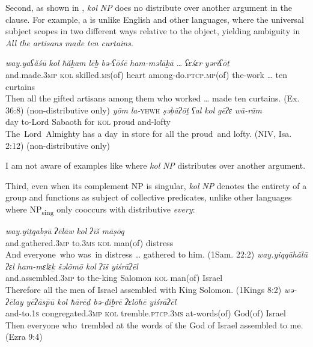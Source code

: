 \documentclass[output=paper]{langsci/langscibook}
\begin{document}
Second, as shown in , \textit{kol} \textit{NP} does no distribute over another argument in the clause. For example, a is unlike English and other languages, where the universal subject scopes in two different ways relative to the object, yielding ambiguity in \textit{All} \textit{the} \textit{artisans} \textit{made} \textit{ten} \textit{curtains}.

\ea%
    \label{ex:doron:15}
    \ea
    \gll \textit{way.yaʕăśū}      \textit{kol}   \textit{ħăḵam}            \textit{lēḇ}     \textit{bə-ʕōśē}                          \textit{ham-məlāḵā}  …  \textit{ʕɛśɛr}  \textit{yərīʕōṯ}\\
         and.made.\textsc{3mp} \textsc{kol} skilled.\textsc{ms}(of) heart among-do.\textsc{ptcp.mp}(of)  the-work      \textsc{…}   ten    curtains  \\
    \glt Then all the gifted artisans among them who worked … made ten curtains.   (Ex. 36:8)  (non-distributive only)
    \ex
    \gll \textit{yōm} \textit{la-}\textsc{yhwh}\textit{\MakeUppercase{} } \textit{ṣəḇāʔōṯ}    \textit{ʕal}  \textit{kol}    \textit{gēʔɛ}    \textit{wā-rām}       \\
         day  to-Lord   Sabaoth   for  \textsc{kol}  proud and-lofty  \\
    \glt The~Lord~Almighty has a day~in store for all the proud~and lofty. (NIV, Isa. 2:12) (non-distributive only)
    \z
\z

I am not aware of examples like  where \textit{kol} \textit{NP} distributes over another argument.

Third, even when its complement NP is singular, \textit{kol} \textit{NP} denotes the entirety of a group and functions as subject of collective predicates, unlike other languages where NP\textsubscript{sing} only cooccurs with distributive \textit{every}:

\ea%
    \label{ex:doron:16}
    \ea
    \gll \textit{way.yiṯqabṣū}         \textit{ʔēlāw}    \textit{kol}   \textit{ʔīš}           \textit{māṣōq}\\
         and.gathered.3\textsc{mp}  to.\textsc{3ms}  \textsc{kol} man(of) distress \\
    \glt And everyone~who was~in distress … gathered to him. (1Sam. 22:2)
    \ex
    \gll \textit{way.yiqqāhălū}          \textit{ʔɛl} \textit{ham-mɛlɛḵ}  \textit{šəlōmō}    \textit{kol}   \textit{ʔīš}          \textit{yiśrāʔēl}\\
         and.assembled.3\textsc{mp}  to  the-king      Salomon \textsc{kol} man(of) Israel\\
    \glt Therefore all the men of Israel assembled with King Solomon. (1Kings 8:2)
    \ex
    \gll \textit{wə-ʔēlay}   \textit{yēʔās\={p}ū                 kol   ħārēḏ                       bə-ḏiḇrē       ʔɛlōhē      yiśrāʔēl}\\
         and-to.\textsc{1s}  congregated.3\textsc{mp}  \textsc{kol} tremble.\textsc{ptcp.3ms}  at-words(of)  God(of)  Israel\\
    \glt Then everyone who~trembled at the words of the God of Israel assembled to me. (Ezra 9:4)
    \z
\z
\end{document}
